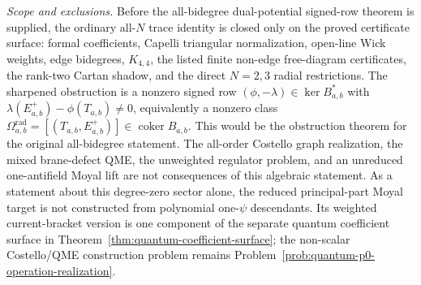 \begin{stmt}
  \emph{Scope and exclusions.} Before the all-bidegree
  dual-potential signed-row theorem is supplied, the ordinary all-\(N\)
  trace identity is closed only on the proved certificate surface: formal coefficients,
  Capelli triangular normalization, open-line Wick weights, edge bidegrees,
  \(K_{4,4}\), the listed finite non-edge free-diagram certificates, the
  rank-two Cartan shadow, and the direct \(N=2,3\) radial restrictions.
  The sharpened obstruction is a nonzero signed row
  \((\phi,-\lambda)\in\ker B_{a,b}^*\) with
  \(\lambda(E^+_{a,b})-\phi(T_{a,b})\ne0\), equivalently a nonzero
  class
  \(\Omega^{\mathrm{rad}}_{a,b}
  =[(T_{a,b},E^+_{a,b})]\in\operatorname{coker}B_{a,b}\).  This would be
  the obstruction theorem for the
  original all-bidegree statement.  The all-order Costello graph
  realization, the mixed brane-defect QME, the unweighted regulator
  problem, and an unreduced one-antifield Moyal lift are not consequences
  of this algebraic statement.
  As a statement about this degree-zero sector alone, the reduced
  principal-part Moyal target is not constructed from polynomial
  one-\(\psi\) descendants.  Its weighted current-bracket version is one
  component of the separate quantum coefficient surface in
  Theorem~\ref{thm:quantum-coefficient-surface}; the non-scalar
  Costello/QME construction problem remains
  Problem~\ref{prob:quantum-p0-operation-realization}.
\end{stmt}


